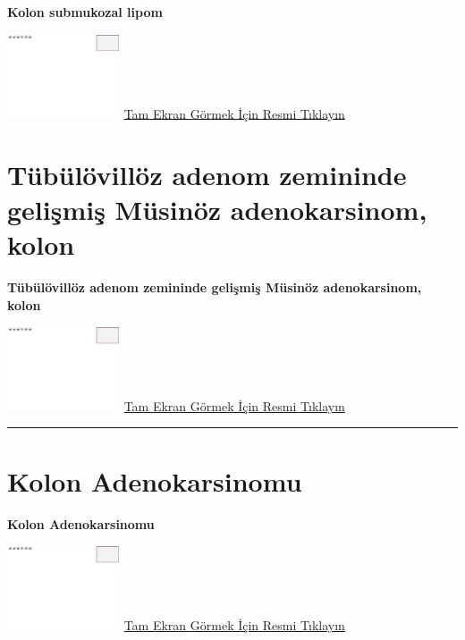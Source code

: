 \documentclass[
  letterpaper,
  DIV=11,
  numbers=noendperiod]{scrreprt}
\begin{document}
\textbf{Kolon submukozal lipom}

\href{https://images.patolojiatlasi.com/template/HE.html}{\includegraphics[width=0.25\textwidth,height=\textheight]{./screenshots/template_screenshot.png}}
\href{https://images.patolojiatlasi.com/colon-submucosal-lipoma/HE.html}{Tam
Ekran Görmek İçin Resmi Tıklayın}

\hypertarget{sec-tubulovilloz-adenom-zemininde-adenokarsinom}{%
\chapter{Tübülövillöz adenom zemininde gelişmiş Müsinöz adenokarsinom,
kolon}\label{sec-tubulovilloz-adenom-zemininde-adenokarsinom}}

\textbf{Tübülövillöz adenom zemininde gelişmiş Müsinöz adenokarsinom,
kolon}

\href{https://images.patolojiatlasi.com/template/HE.html}{\includegraphics[width=0.25\textwidth,height=\textheight]{./screenshots/template_screenshot.png}}
\href{https://images.patolojiatlasi.com/mucinous-adenocarcinoma-colon/HE.html}{Tam
Ekran Görmek İçin Resmi Tıklayın}

\begin{center}\rule{0.5\linewidth}{0.5pt}\end{center}

\hypertarget{sec-kolon-adenokarsinomu}{%
\chapter{Kolon Adenokarsinomu}\label{sec-kolon-adenokarsinomu}}

\textbf{Kolon Adenokarsinomu}

\href{https://images.patolojiatlasi.com/template/HE.html}{\includegraphics[width=0.25\textwidth,height=\textheight]{./screenshots/template_screenshot.png}}
\href{https://images.patolojiatlasi.com/colon-adenocarcinoma/HE.html}{Tam
Ekran Görmek İçin Resmi Tıklayın}
\end{document}
